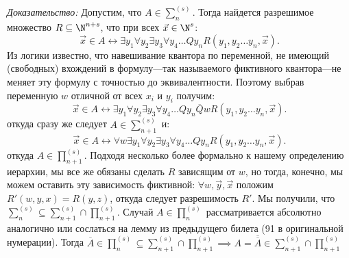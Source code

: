 \documentclass[a4paper, 10pt]{article}
\begin{document}
\textit{Доказательство:} Допустим, что $A \in \sum_{n}^{(s)}$. Тогда найдется разрешимое множество $R \subseteq \N^{n + s}$, что при всех $\vec{x} \in \N^{s}$:
$$\vec{x} \in A \leftrightarrow \exists y_1 \forall y_2 \exists y_3 \forall y_4 \ldots Q y_n R(y_1, y_2 \ldots y_n, \vec{x}).$$
Из логики известно, что навешивание квантора по переменной, не имеющий (свободных) вхождений в формулу—так называемого фиктивного квантора—не меняет эту формулу с точностью до эквивалентности. Поэтому выбрав переменную $w$ отличной от всех $x_i$ и $y_i$ получим:
$$\vec{x} \in A \leftrightarrow \exists y_1 \forall y_2 \exists y_3 \forall y_4 \ldots Q y_n \overline{Q} w R(y_1, y_2 \ldots y_n, \vec{x}).$$ откуда сразу же следует $A \in \sum_{n+1}^{(s)}$ и:
$$\vec{x} \in A \leftrightarrow \forall w \exists y_1 \forall y_2 \exists y_3 \forall y_4 \ldots Q y_n R(y_1, y_2 \ldots y_n, \vec{x}).$$ откуда $A \in \prod_{n+1}^{(s)}$.
Подходя несколько более формально к нашему определению иерархии, мы все же обязаны сделать $R$ зависящим от $w$, но тогда, конечно, мы можем оставить эту зависимость фиктивной: $\forall w, \vec{y}, \vec{x}$ положим $R'(w, y, x) = R(y, z)$, откуда следует разрешимость $R'$. Мы получили, что $\sum_{n}^{(s)} \subseteq \sum_{n+1}^{(s)} \cap \prod_{n+1}^{(s)}$. Случай $A \in \prod_n^{(s)}$ рассматривается абсолютно аналогично или сослаться на лемму из предыдущего билета (91 в оригинальной нумерации). Тогда $\overline{A} \in \prod_{n}^{(s)} \subseteq \sum_{n+1}^{(s)} \cap \prod_{n+1}^{(s)} \implies A = \overline{\overline{A}} \in \sum_{n+1}^{(s)} \cap \prod_{n+1}^{(s)}$
\end{document}

